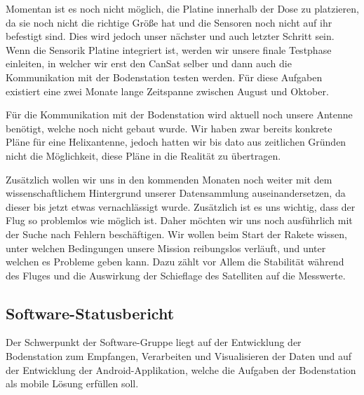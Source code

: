 Momentan ist es noch nicht möglich, die Platine innerhalb der Dose zu platzieren, da sie noch nicht die richtige Größe hat und die Sensoren noch nicht auf ihr befestigt sind. Dies wird jedoch unser nächster und auch letzter Schritt sein. Wenn die Sensorik Platine integriert ist, werden wir unsere finale Testphase einleiten, in welcher wir erst den CanSat selber und dann auch die Kommunikation mit der Bodenstation testen werden. Für diese Aufgaben existiert eine zwei Monate lange Zeitspanne zwischen August und Oktober.

Für die Kommunikation mit der Bodenstation wird aktuell noch unsere Antenne benötigt, welche noch nicht gebaut wurde. Wir haben zwar bereits konkrete Pläne für eine Helixantenne, jedoch hatten wir bis dato aus zeitlichen Gründen nicht die Möglichkeit, diese Pläne in die Realität zu übertragen.

Zusätzlich wollen wir uns in den kommenden Monaten noch weiter mit dem wissenschaftlichem Hintergrund unserer Datensammlung auseinandersetzen, da dieser bis jetzt etwas vernachlässigt wurde. Zusätzlich ist es uns wichtig, dass der Flug so problemlos wie möglich ist. Daher möchten wir uns noch ausführlich mit der Suche nach Fehlern beschäftigen. Wir wollen beim Start der Rakete wissen, unter welchen Bedingungen unsere Mission reibungslos verläuft, und unter welchen es Probleme geben kann. Dazu zählt vor Allem die Stabilität während des Fluges und die Auswirkung der Schieflage des Satelliten auf die Messwerte.

\subsection{Software-Statusbericht}
Der Schwerpunkt der Software-Gruppe liegt auf der Entwicklung der Bodenstation zum Empfangen, Verarbeiten und Visualisieren der Daten und auf der Entwicklung der Android-Applikation, welche die Aufgaben der Bodenstation als mobile Lösung erfüllen soll.

